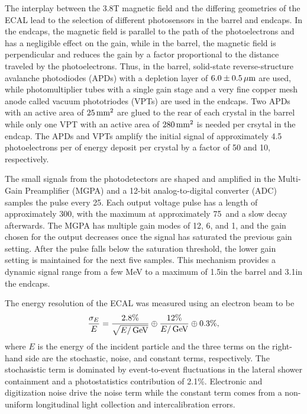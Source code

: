 The interplay between the 3.8\unit{T} magnetic field and the differing geometries of the ECAL lead to the selection of different photosensors in the barrel and endcaps.
In the endcaps, the magnetic field is parallel to the path of the photoelectrons and has a negligible effect on the gain, while in the barrel, the magnetic field is perpendicular and reduces the gain by a factor proportional to the distance traveled by the photoelectrons.
Thus, in the barrel, solid-state reverse-structure avalanche photodiodes (APDs) with a depletion layer of $6.0\pm0.5\,\mu\text{m}$ are used, while photomultiplier tubes with a single gain stage and a very fine copper mesh anode called vacuum phototriodes (VPTs) are used in the endcaps. 
Two APDs with an active area of $25\,\text{mm}^2$ are glued to the rear of each crystal in the barrel while only one VPT with an active area of $280\,\text{mm}^2$ is needed per crsytal in the endcap.
The APDs and VPTs amplify the initial signal of approximately 4.5 photoelectrons per \MeV of energy deposit per crystal by a factor of 50 and 10, respectively. 

The small signals from the photodetectors are shaped and amplified in the Multi-Gain Preamplifier (MGPA) and a 12-bit analog-to-digital converter (ADC) samples the pulse every 25\ns.
Each output voltage pulse has a length of approximately 300\ns, with the maximum at approximately 75\ns\ and a slow decay afterwards. 
The MGPA has multiple gain modes of 12, 6, and 1, and the gain chosen for the output decreases once the signal has saturated the previous gain setting.
After the pulse falls below the saturation threshold, the lower gain setting is maintained for the next five samples.
This mechanism provides a dynamic signal range from a few MeV to a maximum of 1.5\TeV in the barrel and 3.1\TeV in the endcaps.

The energy resolution of the ECAL was measured using an electron beam to be
\begin{equation}
  \frac{\sigma_E}{E} = \frac{2.8\%}{\sqrt{E/\,\text{Ge\hspace{-.08em}V}}} \oplus \frac{12\%}{E/\,\text{Ge\hspace{-.08em}V}} \oplus 0.3\%,
\end{equation}
where $E$ is the energy of the incident particle and the three terms on the right-hand side are the stochastic, noise, and constant terms, respectively.
The stochasistic term is dominated by event-to-event fluctuations in the lateral shower containment and a photostatistics contribution of 2.1\%.
Electronic and digitization noise drive the noise term while the constant term comes from a non-uniform longitudinal light collection and intercalibration errors.


